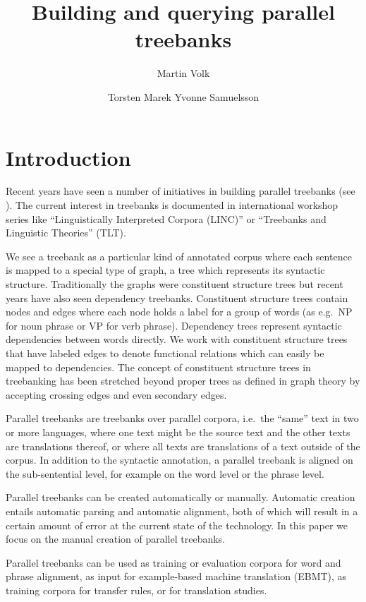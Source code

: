 \documentclass[output=paper]{LSP/langsci}
\author{Martin Volk\affiliation{University of Zurich, Institute of Computational Linguistics}\and
Torsten Marek\lastand 
Yvonne Samuelsson\affiliation{Stockholm University, Department of Linguistics}
}
\title{Building and querying parallel treebanks}
\begin{document}

\section{Introduction}\label{sec:volk:1}

Recent years have seen a number of initiatives in building parallel treebanks (see \citealt{Abeillé2003, NivreEtAl2005}). The current interest in treebanks is documented in international workshop series like ``Linguistically Interpreted Corpora (LINC)'' or ``Treebanks and Linguistic Theories'' (TLT). 

We see a treebank as a particular kind of annotated corpus where each sentence is mapped to a special type of graph, a tree which represents its syntactic structure. Traditionally the graphs were constituent structure trees but recent years have also seen dependency treebanks. Constituent structure trees contain nodes and edges where each node holds a label for a group of words (as e.g.~NP for noun phrase or VP for verb phrase). Dependency trees represent syntactic dependencies between words directly. We work with constituent structure trees that have labeled edges to denote functional relations which can easily be mapped to dependencies. The concept of constituent structure trees in treebanking has been stretched beyond proper trees as defined in graph theory by accepting crossing edges and even secondary edges. 

Parallel treebanks are treebanks over parallel corpora, i.e.~the ``same'' text in two or more languages, where one text might be the source text and the other texts are translations thereof, or where all texts are translations of a text outside of the corpus. In addition to the syntactic annotation, a parallel treebank is aligned on the sub-sentential level, for example on the word level or the phrase level. 

Parallel treebanks can be created automatically or manually. Automatic creation entails automatic parsing and automatic alignment, both of which will result in a certain amount of error at the current state of the technology. In this paper we focus on the manual creation of parallel treebanks. 

Parallel treebanks can be used as training or evaluation corpora for word and phrase alignment, as input for example-based machine translation (EBMT), as training corpora for transfer rules, or for translation studies. 
\end{document}
